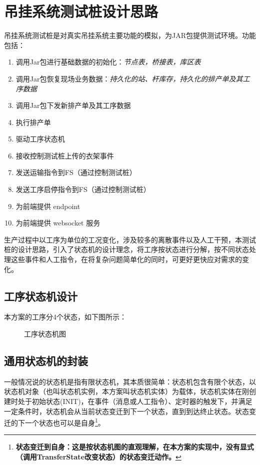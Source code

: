 \section{吊挂系统测试桩设计思路}
吊挂系统测试桩是对真实吊挂系统主要功能的模拟，为JAR包提供测试环境。功能包括：
\begin{enumerate}[label=\arabic*)]
	\item 调用Jar包进行基础数据的初始化：\it{节点表}，\it{桥接表}，\it{库区表}
	\item 调用Jar包恢复现场业务数据：\it{持久化的站、杆库存}，\it{持久化的排产单及其工序数据}
	\item 调用Jar包下发新排产单及其工序数据
	\item 执行排产单
	\item 驱动工序状态机
	\item 接收控制测试桩上传的衣架事件
	\item 发送运输指令到FS（通过控制测试桩）
	\item 发送工序启停指令到FS（通过控制测试桩）
	\item 为前端提供 endpoint 
	\item 为前端提供 websocket 服务
\end{enumerate}
生产过程中以工序为单位的工况变化，涉及较多的离散事件以及人工干预，本测试桩的设计思路，引入了状态机的设计理念，将工序按状态进行分解，按不同状态处理这些事件和人工指令，在将复杂问题简单化的同时，可更好更快应对需求的变化。
\subsection {工序状态机设计}
本方案的工序分4个状态，如下图所示：
\begin{figure}[!h]
	\centering
	\resizebox{0.8\linewidth}{!}{}
	\caption{工序状态机图}\label{fig:sm-process}
\end{figure}
\subsection {通用状态机的封装}
一般情况说的状态机是指有限状态机，其本质很简单：状态机包含有限个状态，以状态机对象（也叫状态机实例，本方案叫状态机实体）为载体，状态机实体在刚创建时处于初始状态(INIT)，在事件（消息或人工指令）、定时器的触发下，并满足一定条件时，状态机会从当前状态变迁到下一个状态，直到到达终止状态。状态变迁的下一个状态也可以是自身\footnote{\bf{状态变迁到自身}：这是按状态机图的直观理解，在本方案的实现中，没有显式（调用TransferState改变状态）的状态变迁动作。}。

